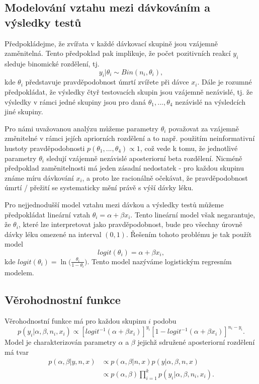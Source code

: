 \subsection{Modelování vztahu mezi dávkováním a výsledky testů}

Předpokládejme, že zvířata v každé dávkovací skupině jsou vzájemně zaměnitelná. Tento předpoklad pak implikuje, že počet pozitivních reakcí $y_i$ sleduje binomické rozdělení, tj.
\begin{equation}
y_i | \theta_i \sim Bin(n_i, \theta_i),
\end{equation}
kde $\theta_i$ představuje pravděpodobnost úmrtí zvířete při dávce $x_i$. Dále je rozumné předpokládat, že výsledky čtyř testovacích skupin jsou vzájemně nezávislé, tj. že výsledky v rámci jedné skupiny jsou pro daná $\theta_1, ..., \theta_4$ nezávislé na výsledcích jiné skupiny.

Pro námi uvažovanou analýzu můžeme parametry $\theta_i$ považovat za vzájemně změnitelné v rámci jejích apriorních rozdělení a to např. použitím neinformativní hustoty pravděpodobnosti $p(\theta_1, ..., \theta_4) \varpropto 1$, což vede k tomu, že jednotlivé parametry $\theta_i$ sledují vzájemně nezávislé aposteriorní beta rozdělení. Nicméně předpoklad zaměnitelnosti má jeden zásadní nedostatek - pro každou skupinu známe míru dávkování $x_i$, a proto lze racionálně očekávat, že pravděpodobnost úmrtí / přežití se systematicky mění právě s výší dávky léku.

Pro nejjednodušší model vztahu mezi dávkou a výsledky testů můžeme předpokládat lineární vztah $\theta_i = \alpha + \beta x_i$. Tento lineární model však negarantuje, že $\theta_i$, které lze interpretovat jako pravděpodobnost, bude pro všechny úrovně dávky léku omezené na interval $(0, 1)$. Řešením tohoto problému je tak použít model
\begin{equation}
logit(\theta_i) = \alpha + \beta x_i,
\end{equation} 
kde $logit(\theta_i) = \ln \Big(\frac{\theta_i}{1 - \theta_i}\Big)$. Tento model nazýváme logistickým regresním modelem.

\subsection{Věrohodnostní funkce}

Věrohodnostní funkce má pro každou skupinu $i$ podobu
\begin{equation}
p(y_i | \alpha, \beta, n_i, x_i) \varpropto [logit^{-1}(\alpha + \beta x_i)]^{y_i}[1 - logit^{-1}(\alpha + \beta x_i)]^{n_i - y_i}.
\end{equation}
Model je charakterizován parametry $\alpha$ a $\beta$ jejichž sdružené aposteriorní rozdělení má tvar
\begin{equation}
\begin{split}
p(\alpha, \beta | y, n, x) & \varpropto p(\alpha, \beta | n, x) p(y | \alpha, \beta, n, x)\\
 & \varpropto p(\alpha, \beta) \prod_{i = 1}^k p(y_i | \alpha, \beta, n_i, x_i).
\end{split}
\end{equation}

